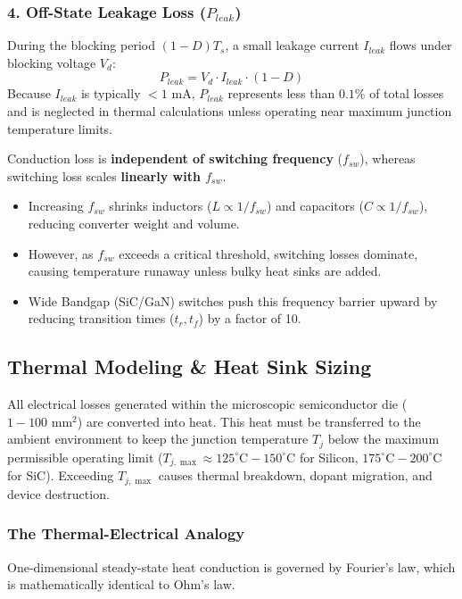 \documentclass[11pt,a4paper]{article}
\begin{document}
\subsubsection{4. Off-State Leakage Loss ($P_{leak}$)}
During the blocking period $(1-D) T_s$, a small leakage current $I_{leak}$ flows under blocking voltage $V_d$:
\begin{equation}
P_{leak} = V_d \cdot I_{leak} \cdot (1 - D)
\end{equation}
Because $I_{leak}$ is typically $< 1\text{ mA}$, $P_{leak}$ represents less than $0.1\%$ of total losses and is neglected in thermal calculations unless operating near maximum junction temperature limits.

\begin{alertbox}
Conduction loss is \textbf{independent of switching frequency} ($f_{sw}$), whereas switching loss scales \textbf{linearly with $f_{sw}$}. 
\begin{itemize}
  \item Increasing $f_{sw}$ shrinks inductors ($L \propto 1/f_{sw}$) and capacitors ($C \propto 1/f_{sw}$), reducing converter weight and volume.
  \item However, as $f_{sw}$ exceeds a critical threshold, switching losses dominate, causing temperature runaway unless bulky heat sinks are added. 
  \item Wide Bandgap (SiC/GaN) switches push this frequency barrier upward by reducing transition times ($t_r, t_f$) by a factor of 10.
\end{itemize}
\end{alertbox}

\subsection{Thermal Modeling \& Heat Sink Sizing}

All electrical losses generated within the microscopic semiconductor die ($1-100\text{ mm}^2$) are converted into heat. This heat must be transferred to the ambient environment to keep the junction temperature $T_j$ below the maximum permissible operating limit ($T_{j,\max} \approx 125^\circ\text{C} - 150^\circ\text{C}$ for Silicon, $175^\circ\text{C} - 200^\circ\text{C}$ for SiC). Exceeding $T_{j,\max}$ causes thermal breakdown, dopant migration, and device destruction.

\subsubsection{The Thermal-Electrical Analogy}
One-dimensional steady-state heat conduction is governed by Fourier's law, which is mathematically identical to Ohm's law.
\end{document}
